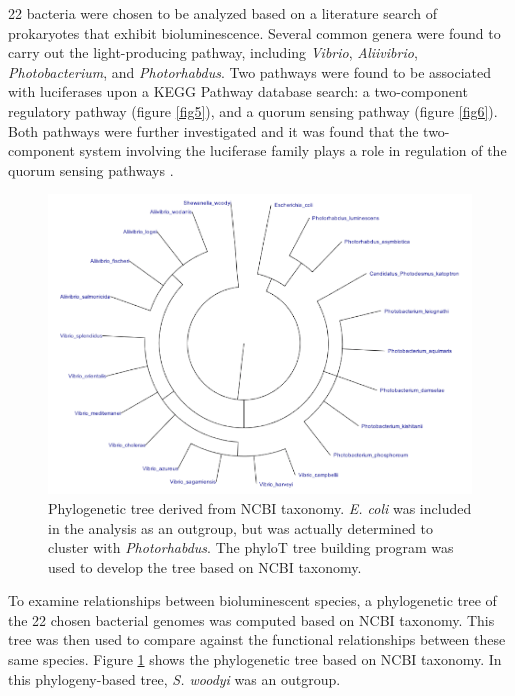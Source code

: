 \documentclass[fleqn,12pt]{wlscirep}
\begin{document}
22 bacteria were chosen to be analyzed based on a literature search of prokaryotes that exhibit bioluminescence. Several common genera were found to carry out the light-producing pathway, including \textit{Vibrio}, \textit{Aliivibrio}, \textit{Photobacterium}, and \textit{Photorhabdus}. Two pathways were found to be associated with luciferases upon a KEGG Pathway database search: a two-component regulatory pathway (figure \ref{fig5}), and a quorum sensing pathway (figure \ref{fig6})\cite{d7}. Both pathways were further investigated and it was found that the two-component system involving the luciferase family plays a role in regulation of the quorum sensing pathways \cite{d1}. 

\begin{figure}[ht]
\includegraphics[width=\textwidth]{1.png}
\caption{Phylogenetic tree derived from NCBI taxonomy. \textit{E. coli} was included in the analysis as an outgroup, but was actually determined to cluster with \textit{Photorhabdus}. The phyloT tree building program was used to develop the tree based on NCBI taxonomy.}
\centering
\label{fig1}
\end{figure}

To examine relationships between bioluminescent species, a phylogenetic tree of the 22 chosen bacterial genomes was computed based on NCBI taxonomy. This tree was then used to compare against the functional relationships between these same species. Figure \ref{fig1} shows the phylogenetic tree based on NCBI taxonomy. In this phylogeny-based tree, \textit{S. woodyi} was an outgroup.
\end{document}

